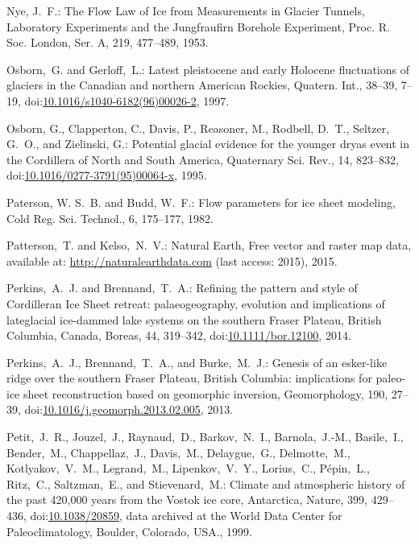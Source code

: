 \documentclass[tc, manuscript]{copernicus}
\begin{document}
\begin{thebibliography}{114}
Nye, J.~F.: The Flow Law of Ice from Measurements in Glacier Tunnels, Laboratory Experiments and the Jungfraufirn Borehole Experiment, Proc. R. Soc. London, Ser. A, 219, 477--489, 1953.


Osborn,~G. and Gerloff,~L.: Latest pleistocene and early Holocene fluctuations of glaciers in the Canadian and northern American Rockies, Quatern. Int., 38--39, 7--19,
doi:\href{http://dx.doi.org/10.1016/s1040-6182(96)00026-2}{10.1016/s1040-6182(96)00026-2}, 1997.


Osborn, G., Clapperton, C., Davis, P., Reasoner, M., Rodbell, D.~T., Seltzer, G.~O., and Zielinski, G.: Potential glacial evidence for the younger dryas event in the Cordillera of North and South America, Quaternary Sci. Rev., 14, 823--832,
doi:\href{http://dx.doi.org/10.1016/0277-3791(95)00064-x}{10.1016/0277-3791(95)00064-x}, 1995.


Paterson, W. S.~B. and Budd, W.~F.: Flow parameters for ice sheet modeling, Cold Reg. Sci. Technol., 6, 175--177, 1982.


Patterson,~T. and Kelso,~N.~V.: {N}atural {E}arth, {F}ree vector and raster
map data, available at: \url{http://naturalearthdata.com} (last access:
2015), 2015.


Perkins,~A.~J. and Brennand,~T.~A.: Refining the pattern and style of Cordilleran Ice Sheet retreat: palaeogeography, evolution and implications of lateglacial ice-dammed lake systems on the southern Fraser Plateau, British Columbia, Canada, Boreas, 44, 319--342,
doi:\href{http://dx.doi.org/10.1111/bor.12100}{10.1111/bor.12100}, 2014.


Perkins,~A.~J., Brennand,~T.~A., and Burke,~M.~J.: Genesis of an esker-like ridge over the southern Fraser Plateau, British Columbia: implications for paleo-ice sheet reconstruction based on geomorphic inversion, Geomorphology, 190, 27--39,
doi:\href{http://dx.doi.org/10.1016/j.geomorph.2013.02.005}{10.1016/j.geomorph.2013.02.005}, 2013.


Petit,~J.~R., Jouzel,~J., Raynaud,~D., Barkov,~N.~I., Barnola,~J.-M., Basile,~I., Bender,~M., Chappellaz,~J., Davis,~M., Delaygue,~G., Delmotte,~M., Kotlyakov,~V.~M., Legrand,~M., Lipenkov,~V.~Y., Lorius,~C., P{\'e}pin,~L., Ritz,~C., Saltzman,~E., and Stievenard,~M.: Climate and atmospheric history of the past 420,000 years from the Vostok ice core, Antarctica, Nature, 399, 429--436,
doi:\href{http://dx.doi.org/10.1038/20859}{10.1038/20859}, data archived at the World Data Center for Paleoclimatology, Boulder, Colorado, USA., 1999.



\end{thebibliography}
\end{document}
